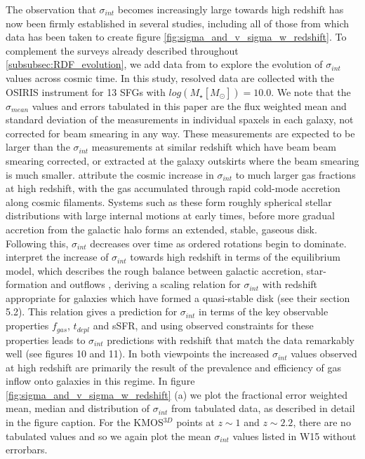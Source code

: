 \documentclass[fleqn,usenatbib]{mn2e}
\begin{document}
The observation that $\sigma_{int}$ becomes increasingly large towards high redshift has now been firmly established in several studies, including all of those from which data has been taken to create figure \ref{fig:sigma_and_v_sigma_w_redshift}.
To complement the surveys already described throughout \cref{subsubsec:RDF_evolution}, we add data from \cite{Law2009} to explore the evolution of $\sigma_{int}$ values across cosmic time.
In this study, resolved data are collected with the OSIRIS instrument for 13 SFGs with $log(M_{\star}[M_{\odot}])=10.0$.
We note that the $\sigma_{mean}$ values and errors tabulated in this paper are the flux weighted mean and standard deviation of the measurements in individual spaxels in each galaxy, not corrected for beam smearing in any way.
These measurements are expected to be larger than the $\sigma_{int}$ measurements at similar redshift which have beam beam smearing corrected, or extracted at the galaxy outskirts where the beam smearing is much smaller.
\cite{Law2009} attribute the cosmic increase in $\sigma_{int}$ to much larger gas fractions at high redshift, with the gas accumulated through rapid cold-mode accretion along cosmic filaments.
Systems such as these form roughly spherical stellar distributions with large internal motions at early times, before more gradual accretion from the galactic halo forms an extended, stable, gaseous disk.
Following this, $\sigma_{int}$ decreases over time as ordered rotations begin to dominate.
\cite{Wisnioski2015} interpret the increase of $\sigma_{int}$ towards high redshift in terms of the equilibrium model, which describes the rough balance between galactic accretion, star-formation and outflows \citep[e.g.][]{Lilly2013}, deriving a scaling relation for $\sigma_{int}$ with redshift appropriate for galaxies which have formed a quasi-stable disk (see their section 5.2).
This relation gives a prediction for $\sigma_{int}$ in terms of the key observable properties $f_{gas}$, $t_{depl}$ and sSFR, and using observed constraints for these properties leads to $\sigma_{int}$ predictions with redshift that match the data remarkably well (see \cite{Wisnioski2015} figures 10 and 11).
In both viewpoints the increased $\sigma_{int}$ values observed at high redshift are primarily the result of the prevalence and efficiency of gas inflow onto galaxies in this regime.
In figure \ref{fig:sigma_and_v_sigma_w_redshift} (a) we plot the fractional error weighted mean, median and distribution of $\sigma_{int}$ from tabulated data, as described in detail in the figure caption.
For the KMOS$^{3D}$ points at $z\sim 1$ and $z\sim 2.2$, there are no tabulated values and so we again plot the mean $\sigma_{int}$ values listed in W15 without errorbars.
\end{document}
